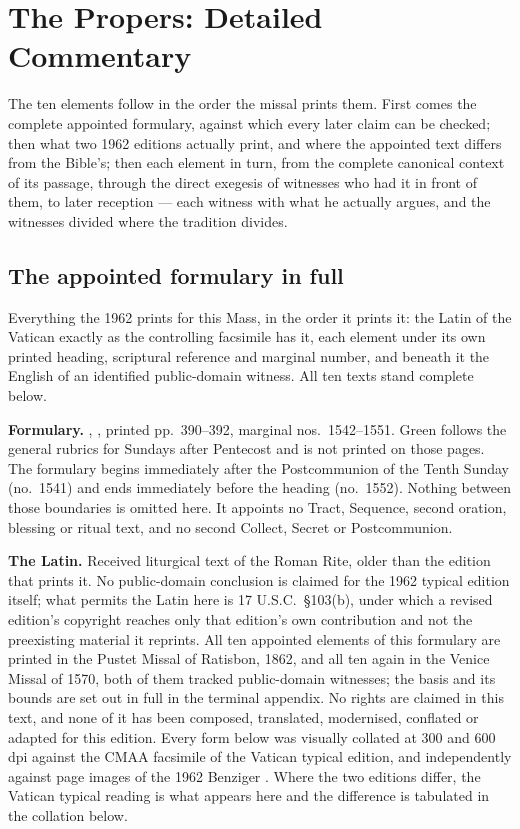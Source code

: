 \section*{The Propers: Detailed Commentary}

The ten elements follow in the order the missal prints them. First comes the
complete appointed formulary, against which every later claim can be checked;
then what two 1962 editions actually print, and where the appointed text
differs from the Bible's; then each element in turn, from the complete
canonical context of its passage, through the direct exegesis of witnesses who
had it in front of them, to later reception --- each witness with what he
actually argues, and the witnesses divided where the tradition divides.

\subsection*{The appointed formulary in full}

Everything the 1962  prints for this Mass, in the order
it prints it: the Latin of the Vatican  exactly as the
controlling facsimile has it, each element under its own printed heading,
scriptural reference and marginal number, and beneath it the English of an
identified public-domain witness. All ten texts stand complete below.

\textbf{Formulary.} , , printed pp.~390--392, marginal nos.\ 1542--1551. Green follows the
general rubrics for Sundays after Pentecost and is not printed on those pages.
The formulary begins immediately after the Postcommunion of the Tenth Sunday
(no.\ 1541) and ends immediately before the heading  (no.\ 1552). Nothing between those boundaries is omitted
here. It appoints no Tract, Sequence, second oration, blessing or ritual text,
and no second Collect, Secret or Postcommunion.

\textbf{The Latin.} Received liturgical text of the Roman Rite, older than the
edition that prints it. No public-domain conclusion is claimed for the 1962
typical edition itself; what permits the Latin here is 17 U.S.C.\ \S103(b),
under which a revised edition's copyright reaches only that edition's own
contribution and not the preexisting material it reprints. All ten appointed
elements of this formulary are printed in the Pustet Missal of Ratisbon, 1862,
and all ten again in the Venice Missal of 1570, both of them tracked
public-domain witnesses; the basis and its bounds are set out in full in the
terminal appendix. No rights are claimed in this text, and none of it has been
composed, translated, modernised, conflated or adapted for this edition. Every
form
below was visually collated at 300 and 600 dpi against the CMAA facsimile of
the Vatican typical edition, and independently against page images of the 1962
Benziger . Where the two editions differ, the
Vatican typical reading is what appears here and the difference is tabulated
in the collation below.

